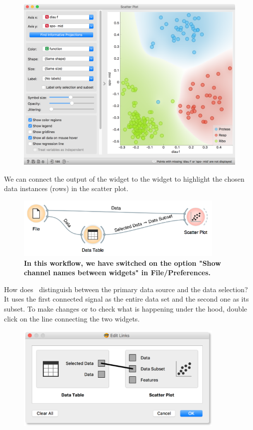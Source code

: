 \begin{figure}
  \centering
  \includegraphics[width=\linewidth]{scatterplot-brown.png}
  \label{fig:workflow-scatterplot}
\end{figure}

We can connect the output of the  widget to the  widget to highlight the chosen data instances (rows) in the scatter plot.

\begin{figure}
  \includegraphics[width=100mm]{workflow-fig5.png}
  \caption{\textbf{\textsf{In this workflow, we have switched on the option "Show channel names between widgets" in File/Preferences.}}}
  \label{fig:workflow-fig5}
\end{figure}

How does \mutation\ distinguish between the primary data source and the data selection? It uses the first connected signal as the entire data set and the second one as its subset. To make changes or to check what is happening under the hood, double click on the line connecting the two widgets.
\newpage

\begin{figure}[h]
  \flushright
  \includegraphics[width=100mm]{workflow-fig6.png}
\label{fig:workflow-fig6}%
\end{figure}

